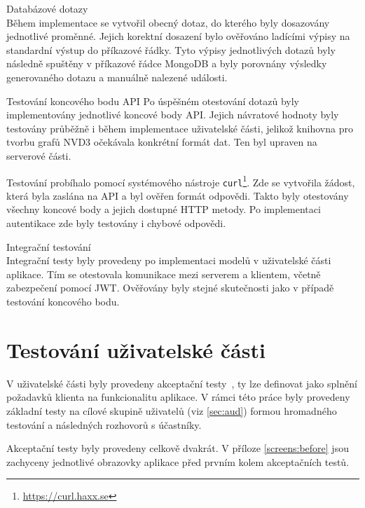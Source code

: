 \begin{description}
    \item Databázové dotazy\\
        Během implementace se vytvořil obecný dotaz, do kterého byly dosazovány jednotlivé proměnné. Jejich korektní dosazení bylo ověřováno ladícími výpisy na standardní výstup do příkazové řádky. Tyto výpisy jednotlivých dotazů byly následně spuštěny v příkazové řádce MongoDB a byly porovnány výsledky generovaného dotazu a manuálně nalezené události.

    \item Testování koncového bodu API
        Po úspěšném otestování dotazů byly implementovány jednotlivé koncové body API. Jejich návratové hodnoty byly testovány průběžně i během implementace uživatelské části, jelikož knihovna pro tvorbu grafů NVD3 očekávala konkrétní formát dat. Ten byl upraven na serverové části.

        Testování probíhalo pomocí systémového nástroje \texttt{curl}\footnote{\url{https://curl.haxx.se}}. Zde se vytvořila žádost, která byla zaslána na API a byl ověřen formát odpovědi. Takto byly otestovány všechny koncové body a jejich dostupné HTTP metody. Po implementaci autentikace zde byly testovány i chybové odpovědi.

    \item Integrační testování\\
        Integrační testy byly provedeny po implementaci modelů v uživatelské části aplikace. Tím se otestovala komunikace mezi serverem a klientem, včetně zabezpečení pomocí JWT. Ověřovány byly stejné skutečnosti jako v případě testování koncového bodu.

\end{description}

\section{Testování uživatelské části}

V uživatelské části byly provedeny akceptační testy~\cite{acp:tests}, ty lze definovat jako splnění požadavků klienta na funkcionalitu aplikace. V rámci této práce byly provedeny základní testy na cílové skupině uživatelů (viz \ref{sec:aud}) formou hromadného testování a následných rozhovorů s účastníky.

Akceptační testy byly provedeny celkově dvakrát. V příloze \ref{screens:before} jsou zachyceny jednotlivé obrazovky aplikace před prvním kolem akceptačních testů.

